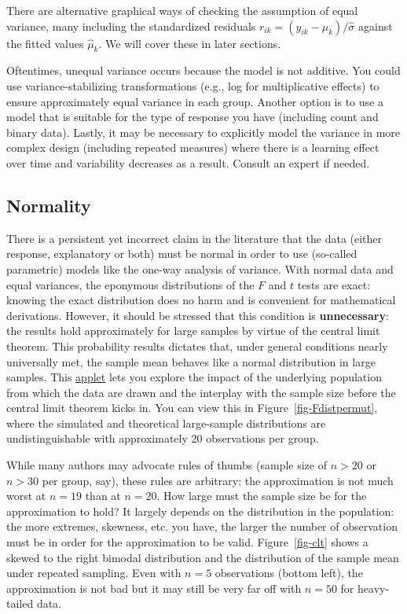 \documentclass[
  11pt,
  letterpaper,
]{scrbook}
\theoremstyle{definition}
\theoremstyle{remark}
\begin{document}
There are alternative graphical ways of checking the assumption of equal
variance, many including the standardized residuals
\(r_{ik} = (y_{ik} - \widehat{\mu}_k)/\widehat{\sigma}\) against the
fitted values \(\widehat{\mu}_k\). We will cover these in later
sections.

Oftentimes, unequal variance occurs because the model is not additive.
You could use variance-stabilizing transformations (e.g., log for
multiplicative effects) to ensure approximately equal variance in each
group. Another option is to use a model that is suitable for the type of
response you have (including count and binary data). Lastly, it may be
necessary to explicitly model the variance in more complex design
(including repeated measures) where there is a learning effect over time
and variability decreases as a result. Consult an expert if needed.

\hypertarget{normality}{%
\subsection{Normality}\label{normality}}

There is a persistent yet incorrect claim in the literature that the
data (either response, explanatory or both) must be normal in order to
use (so-called parametric) models like the one-way analysis of variance.
With normal data and equal variances, the eponymous distributions of the
\(F\) and \(t\) tests are exact: knowing the exact distribution does no
harm and is convenient for mathematical derivations. However, it should
be stressed that this condition is \textbf{unnecessary}: the results
hold approximately for large samples by virtue of the central limit
theorem. This probability results dictates that, under general
conditions nearly universally met, the sample mean behaves like a normal
distribution in large samples. This
\href{http://195.134.76.37/applets/AppletCentralLimit/Appl_CentralLimit2.html}{applet}
lets you explore the impact of the underlying population from which the
data are drawn and the interplay with the sample size before the central
limit theorem kicks in. You can view this in
Figure~\ref{fig-Fdistpermut}, where the simulated and theoretical
large-sample distributions are undistinguishable with approximately 20
observations per group.

While many authors may advocate rules of thumbs (sample size of \(n>20\)
or \(n>30\) per group, say), these rules are arbitrary: the
approximation is not much worst at \(n=19\) than at \(n=20\). How large
must the sample size be for the approximation to hold? It largely
depends on the distribution in the population: the more extremes,
skewness, etc. you have, the larger the number of observation must be in
order for the approximation to be valid. Figure~\ref{fig-clt} shows a
skewed to the right bimodal distribution and the distribution of the
sample mean under repeated sampling. Even with \(n=5\) observations
(bottom left), the approximation is not bad but it may still be very far
off with \(n=50\) for heavy-tailed data.
\end{document}
